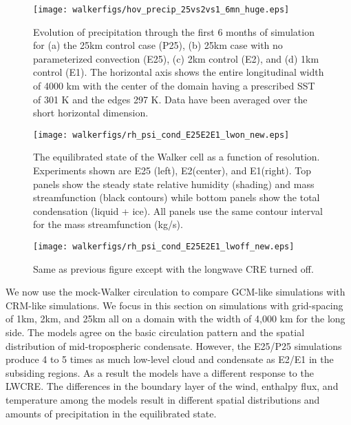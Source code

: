 \documentclass[draft]{agujournal2019}
\begin{document}
{\begin{figure}
  \texttt{[image: walkerfigs/hov\_precip\_25vs2vs1\_6mn\_huge.eps]}
  \caption{Evolution of precipitation through the first 6 months of simulation for (a) the 25km control case (P25), 
  (b) 25km case with no parameterized convection (E25), (c) 2km control (E2), and (d) 1km control (E1).  
  The horizontal axis shows the entire longitudinal width of 4000 km with the center of the domain having a prescribed SST of 301 K and the edges 297 K.  
  Data have been averaged over the short horizontal dimension.} 
  \label{fig:hov_4mods_6mn}
\end{figure}


\begin{figure}
  \centering
      \texttt{[image: walkerfigs/rh\_psi\_cond\_E25E2E1\_lwon\_new.eps]}
      \caption{The equilibrated state of the Walker cell as a function of resolution.  
      Experiments shown are E25 (left), E2(center), and E1(right). Top panels show the 
      steady state relative humidity (shading) and mass streamfunction (black contours)
      while bottom panels show the total condensation (liquid + ice).  
      All panels use the same contour interval for the 
      mass streamfunction (kg/s).}
  \label{fig:rh_psi_P25E2E1}
\end{figure}

\begin{figure}
  \centering
      \texttt{[image: walkerfigs/rh\_psi\_cond\_E25E2E1\_lwoff\_new.eps]}
          \caption{Same as previous figure except with the longwave CRE turned off.}
  \label{fig:rh_psi_P25E2E1_lwoff}
\end{figure}

We now use the mock-Walker circulation to compare GCM-like simulations with CRM-like simulations.  
We focus in this section on simulations with grid-spacing of 1km, 2km, and 25km all on a domain with the width of 4,000 km for the long side.  
The models agree on 
the basic circulation pattern and the spatial distribution of mid-tropospheric condensate.  
However, the E25/P25 simulations produce 4 to 5 times as much low-level cloud and 
condensate as E2/E1 in the subsiding regions.   As a result the models have a different response 
to the LWCRE.  The differences in the boundary layer of the wind, enthalpy flux, and 
temperature among the models result in different spatial distributions and amounts of 
precipitation in the equilibrated state.  

}
\end{document}
